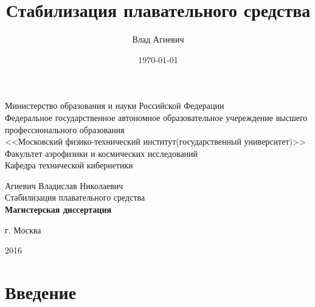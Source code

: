 \documentclass[12pt,a4paper]{article}
\title{Стабилизация плавательного средства}
\author{Влад Агиевич}
\date{\today}
\begin{document}
\begin{titlepage}

\begin{center}
Министерство образования и науки Российской Федерации \\
Федеральное государственное автономное образовательное учереждение высшего профессионального образования \\
<<Московский физико-технический институт(государственный университет)>> \\
Факультет аэрофизики и космических исследований \\
Кафедра технической кибернетики \\
\end{center}

\vspace{8mm}

\vspace{8mm}

\begin{center}
Агиевич Владислав Николаевич \\
{\large Стабилизация плавательного средства \\[8mm]
{\bf Магистерская диссертация\\}
}
\end{center}

\vspace{8mm}

\vspace{10mm}

\begin{center}
г. Москва
\end{center}
\begin{center}
2016
\end{center}
\end{titlepage}

\newpage

\tableofcontents

\newpage

\section{Введение} 
\end{document}
